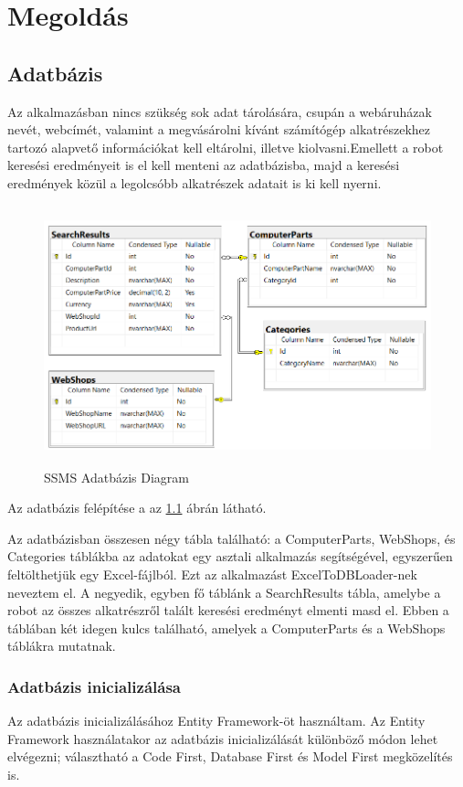 \documentclass[
]{thesis-ekf}
\theoremstyle{definition}
\theoremstyle{remark}
\begin{document}
\chapter{Megoldás}
\section{Adatbázis}
Az alkalmazásban nincs szükség sok adat tárolására, csupán a webáruházak nevét, webcímét, valamint a megvásárolni kívánt számítógép alkatrészekhez tartozó alapvető információkat kell eltárolni, illetve kiolvasni.Emellett a robot keresési eredményeit is el kell menteni az adatbázisba, majd a keresési eredmények közül a legolcsóbb alkatrészek adatait is ki kell nyerni.
	\begin{figure}[!ht]
		\centering
		\includegraphics[width=15cm, height=7.5cm]{entity_diagram}
		\caption{SSMS Adatbázis Diagram}
		\label{picture-adatbazis}
	\end{figure}
Az adatbázis felépítése a az \ref{picture-adatbazis} ábrán látható. 

Az adatbázisban összesen négy tábla található: a ComputerParts, WebShops, és Categories táblákba az adatokat egy asztali alkalmazás segítségével, egyszerűen feltölthetjük egy Excel-fájlból. Ezt az alkalmazást ExcelToDBLoader-nek neveztem el.
A negyedik, egyben fő táblánk a SearchResults tábla, amelybe a robot az összes alkatrészről talált keresési eredményt elmenti masd el. Ebben a táblában két idegen kulcs található, amelyek a ComputerParts és a WebShops táblákra mutatnak.
\subsection{Adatbázis inicializálása}
Az adatbázis inicializálásához Entity Framework-öt használtam. Az Entity Framework használatakor az adatbázis inicializálását különböző módon lehet elvégezni; választható a Code First, Database First és Model First megközelítés is.
\end{document}
